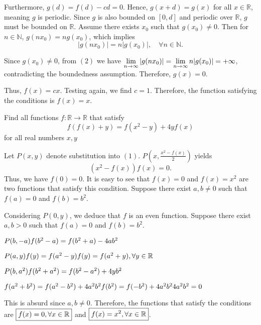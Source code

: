 \documentclass[11pt]{scrartcl}
\begin{document}
\begin{itemize}[label=, leftmargin=0em, itemsep=0.2em]
\begin{sol}
\begin{pro}
            Furthermore, \( g(d) = f(d) - cd = 0 \). Hence, \( g(x+d) = g(x) \) for all \( x \in \mathbb{R} \), meaning \( g \) is periodic. Since \( g \) is also bounded on \( [0, d] \) and periodic over \( \mathbb{R} \), \( g \) must be bounded on \( \mathbb{R} \).
            Assume there exists \( x_0 \) such that \( g(x_0) \neq 0 \). Then for \( n \in \mathbb{N} \), \( g(nx_0) = ng(x_0) \), which implies
            \[
            |g(nx_0)| = n|g(x_0)|, \quad \forall n \in \mathbb{N}.
            \]

            Since \( g(x_0) \neq 0 \), from \( (2) \) we have \( \displaystyle\lim_{n \to \infty} |g(nx_0)| = \displaystyle\lim_{n \to \infty} n|g(x_0)| = +\infty \), contradicting the boundedness assumption. Therefore, \( g(x) = 0 \).
            \end{pro}
            Thus, \( \boxed{f(x) = cx} \).
            Testing again, we find \( c = 1 \). Therefore, the function satisfying the conditions is \( \boxed{f(x) = x} \).

    \end{sol}

   
     \begin{bt}
        Find all functions $f: \mathbb{R} \to \mathbb{R}$ that satisfy
            $$
            f(f(x)+y)=f\left(x^2-y\right)+4 y f(x)
            $$
            for all real numbers $x, y$
    \end{bt}
    \begin{sol}
        Let \( P(x,y) \) denote substitution into \( (1) \). \( P\left(x,\frac{x^2 - f(x)}{2}\right) \) yields 
        \[ (x^2 - f(x))f(x) = 0. \]
        Thus, we have \( f(0) = 0 \). It is easy to see that \( f(x) = 0 \) and \( f(x) = x^2 \) are two functions that satisfy this condition. Suppose there exist \( a, b \neq 0 \) such that \( f(a) = 0 \) and \( f(b) = b^2 \).

        Considering \( P(0,y) \), we deduce that \( f \) is an even function. Suppose there exist \( a, b > 0 \) such that \( f(a) = 0 \) and \( f(b) = b^2 \).

        \( P(b,-a) \ra f(b^2 - a) = f(b^2 + a) - 4ab^2 \)

        \(P(a,y) \ra f(y) = f(a^2 - y) \ra f(y) = f(a^2 + y), \yr \)

        \( P(b,a^2) \ra f(b^2 + a^2) = f(b^2 - a^2) + 4yb^2 \)

        \( \ra f(a^2 + b^2) = f(a^2 - b^2) + 4a^2b^2 \ra f(b^2) = f(-b^2) + 4a^2b^2 \ra 4a^2b^2 = 0 \)

        This is absurd since \( a, b \neq 0 \). Therefore, the functions that satisfy the conditions are \( \boxed{f(x) = 0 ,\forall x\in \mathbb{R}} \) and \( \boxed{f(x) = x^2 ,\forall x\in \mathbb{R}} \).\end{sol}
    


\end{itemize}
\end{document}
